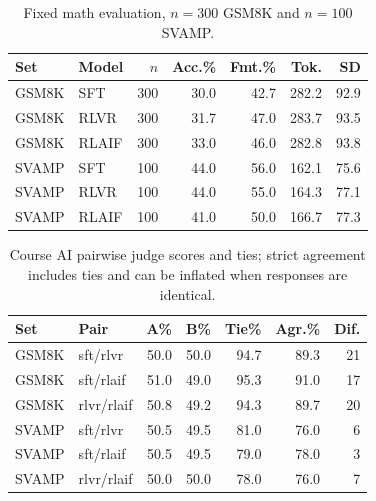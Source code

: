 \begin{table}[!htbp]
\centering
\caption{Fixed math evaluation, $n=300$ GSM8K and $n=100$ SVAMP.}
\label{tab:math}
\scriptsize
\setlength{\tabcolsep}{3.4pt}
\begin{tabular}{llrrrrr}
\toprule
Set & Model & $n$ & Acc.\% & Fmt.\% & Tok. & SD \\
\midrule
GSM8K & SFT & 300 & 30.0 & 42.7 & 282.2 & 92.9 \\
GSM8K & RLVR & 300 & 31.7 & 47.0 & 283.7 & 93.5 \\
GSM8K & RLAIF & 300 & 33.0 & 46.0 & 282.8 & 93.8 \\
SVAMP & SFT & 100 & 44.0 & 56.0 & 162.1 & 75.6 \\
SVAMP & RLVR & 100 & 44.0 & 55.0 & 164.3 & 77.1 \\
SVAMP & RLAIF & 100 & 41.0 & 50.0 & 166.7 & 77.3 \\
\bottomrule
\end{tabular}
\end{table}

\begin{table}[!htbp]
\centering
\caption{Course AI pairwise judge scores and ties; strict agreement includes ties and can be inflated when responses are identical.}
\label{tab:pairwise}
\scriptsize
\setlength{\tabcolsep}{3.4pt}
\begin{tabular}{llrrrrr}
\toprule
Set & Pair & A\% & B\% & Tie\% & Agr.\% & Dif. \\
\midrule
GSM8K & sft/rlvr & 50.0 & 50.0 & 94.7 & 89.3 & 21 \\
GSM8K & sft/rlaif & 51.0 & 49.0 & 95.3 & 91.0 & 17 \\
GSM8K & rlvr/rlaif & 50.8 & 49.2 & 94.3 & 89.7 & 20 \\
SVAMP & sft/rlvr & 50.5 & 49.5 & 81.0 & 76.0 & 6 \\
SVAMP & sft/rlaif & 50.5 & 49.5 & 79.0 & 78.0 & 3 \\
SVAMP & rlvr/rlaif & 50.0 & 50.0 & 78.0 & 76.0 & 7 \\
\bottomrule
\end{tabular}
\end{table}

